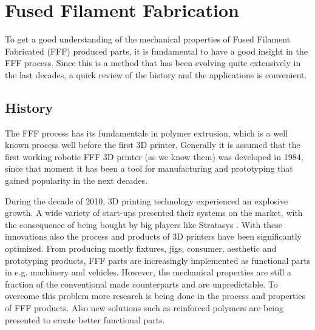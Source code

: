 \section{Fused Filament Fabrication}
    \label{Fused Filament Fabrication}

To get a good understanding of the mechanical properties of Fused Filament Fabricated (FFF) produced parts, it is fundamental to have a good insight in the FFF process. Since this is a method that has been evolving quite extensively in the last decades, a quick review of the history and the applications is convenient.

\subsection{History}
    \label{History}
The FFF process has its fundamentals in polymer extrusion, which is a well known process well before the first 3D printer. Generally it is assumed that the first working robotic FFF 3D printer (as we know them) was developed in 1984, since that moment it has been a tool for manufacturing and prototyping that gained popularity in the next decades. 

During the decade of 2010, 3D printing technology experienced an explosive growth. A wide variety of start-ups presented their systems on the market, with the consequence of being bought by big players like Stratasys \cite{Kamran2016ATechnology}. With these innovations also the process and products of 3D printers have been significantly optimized. From producing mostly fixtures, jigs, consumer, aesthetic and prototyping products, FFF parts are increasingly implemented as functional parts in e.g. machinery and vehicles. However, the mechanical properties are still a fraction of the conventional made counterparts and are unpredictable. To overcome this problem more research is being done in the process and properties of FFF products. Also new solutions such as reinforced polymers are being presented to create better functional parts. 

